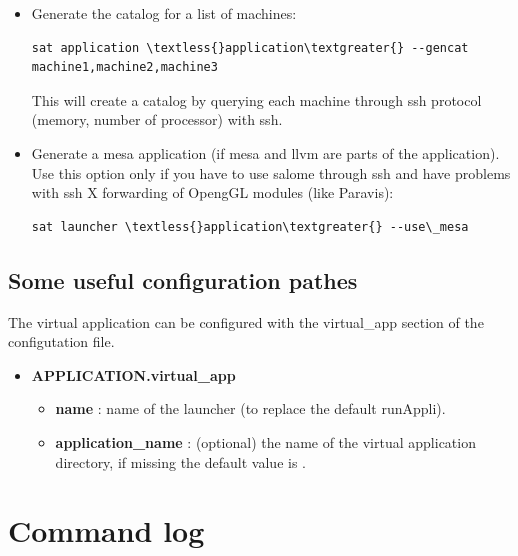 \documentclass[a4paper,10pt,english]{sphinxmanual}
\begin{document}
\begin{itemize}
\item {} 
Generate the catalog for a list of machines:

\begin{Verbatim}[commandchars=\\\{\}]
sat application \textless{}application\textgreater{} --gencat machine1,machine2,machine3
\end{Verbatim}

This will create a catalog by querying each machine through ssh protocol (memory, number of processor) with ssh.

\item {} 
Generate a mesa application (if mesa and llvm are parts of the application). Use this option only if you have to use salome through ssh and have problems with ssh X forwarding of OpengGL modules (like Paravis):

\begin{Verbatim}[commandchars=\\\{\}]
sat launcher \textless{}application\textgreater{} --use\_mesa
\end{Verbatim}

\end{itemize}


\subsection{Some useful configuration pathes}
\label{commands/application:some-useful-configuration-pathes}
The virtual application can be configured with the virtual\_app section of the configutation file.
\begin{itemize}
\item {} 
\textbf{APPLICATION.virtual\_app}
\begin{itemize}
\item {} 
\textbf{name} : name of the launcher (to replace the default runAppli).

\item {} 
\textbf{application\_name} : (optional) the name of the virtual application directory, if missing the default value is .

\end{itemize}

\end{itemize}


\section{Command log}
\label{commands/log:svn}\label{commands/log:command-log}\label{commands/log::doc}
\end{document}
